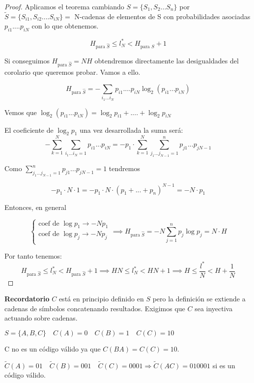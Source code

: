 \begin{proof}
	Aplicamos el teorema cambiando $S = \{ S_1,S_2...S_n \}$ por $\widetilde{S} = \{S_{i1}, S_{i2} .... S_{iN} \} =$ {N-cadenas de elementos de S} con probabilidades asociadas $p_{i1}.... p_{iN}$ con lo que obtenemos.

	$$H _{\text{para } \widehat{S}} \leq l^{*}_N < H _{\text{para } \widehat{S}} +1 $$

	Si conseguimos $H _{\text{para } \widehat{S}} = NH$ obtendremos directamente las desigualdades del corolario que queremos probar. Vamos a ello.

	$$H _{\text{para } \widehat{S}} = - \sum_{i_1...i_N} p_{i1}....p_{iN} \log_2 (p_{i1}...p_{iN})$$

	Vemos que $\log_2 (p_{i1}...p_{iN}) = \log_2 p_{i1} + .... + \log_2 p_{iN}$

	El coeficiente de $\log_2 p_1$ una vez desarrollada la suma será:
	$$- \sum_{k = 1}^{N}\sum_{i_1...i_N = 1} p_{i1} ... p_{iN} = - p_1 \cdot \sum_{k=1}^{N} \sum_{j_1 ... j_{N-1} = 1}^{n} p_{j1} ... p_{jN-1}$$

	Como $\sum_{j_1 ... j_{N-1} = 1}^{n} p_{j1} ... p_{jN-1} = 1$ tendremos

	$$- p_1 \cdot N \cdot 1 = - p_1 \cdot N \cdot ( p_1 + ... + p_n)^{N-1} = -N\cdot p_1$$

	Entonces, en general

	$$\begin{cases}
	\text{coef de } \log p_1 \rightarrow -Np_1\\
	\text{coef de } \log p_j \rightarrow -Np_j\\
	\end{cases}  \implies H _{\text{para } \widehat{S}} = -N \sum_{j=1}^{n} p_j \log p_j = N\cdot H$$

	Por tanto tenemos:
	\[H _{\text{para } \widehat{S}} \leq l^{*}_N < H _{\text{para } \widehat{S}} +1  \implies HN \leq l^{*}_N < H N +1\implies H \leq \frac{l^*}{N} <H+\frac{1}{N} \]


\end{proof}

	\textbf{Recordatorio} $C$ está en principio definido en $S$ pero la definición se extiende a cadenas de símbolos concatenando resultados. Exigimos que $C$ sea inyectiva actuando sobre cadenas.

	\begin{example}

		$S = \{A,B,C\} \quad C(A) = 0 \quad C(B) = 1 \quad C(C) = 10$

		C no es un código válido ya que $C(BA) = C(C) = 10$.

		$\widetilde{C}(A) = 01 \quad \widetilde{C}(B) = 001 \quad \widetilde{C}(C) = 0001 \Rightarrow \widetilde{C}(AC) = 010001 $ si es un código válido.

	\end{example}


